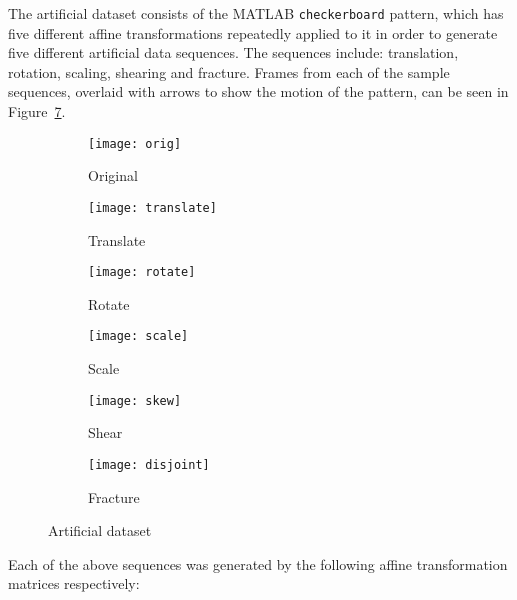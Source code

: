 The artificial dataset consists of the MATLAB \verb|checkerboard| pattern, which has five different affine transformations repeatedly applied to it in order to generate five different artificial data sequences. The sequences include: translation, rotation, scaling, shearing and fracture. Frames from each of the sample sequences, overlaid with arrows to show the motion of the pattern, can be seen in Figure~\ref{fig:artificial}.

\begin{figure}[h]
  \centering
  \begin{subfigure}[b]{.16\textwidth}
    \texttt{[image: orig]}
    \caption{Original}
    \label{fig:orig}
  \end{subfigure}
  \begin{subfigure}[b]{.16\textwidth}
    \texttt{[image: translate]}
    \caption{Translate}
    \label{fig:trans}
  \end{subfigure}
  \begin{subfigure}[b]{.16\textwidth}
    \texttt{[image: rotate]}
    \caption{Rotate}
    \label{fig:rot}
  \end{subfigure}
  \begin{subfigure}[b]{.16\textwidth}
    \texttt{[image: scale]}
    \caption{Scale}
    \label{fig:scale}
  \end{subfigure}
  \begin{subfigure}[b]{.16\textwidth}
    \texttt{[image: skew]}
    \caption{Shear}
    \label{fig:skew}
  \end{subfigure}
  \begin{subfigure}[b]{.16\textwidth}
    \texttt{[image: disjoint]}
    \caption{Fracture}
    \label{fig:disj}
  \end{subfigure}
  \caption{Artificial dataset}
  \label{fig:artificial}
\end{figure}

Each of the above sequences was generated by the following affine transformation matrices respectively:

